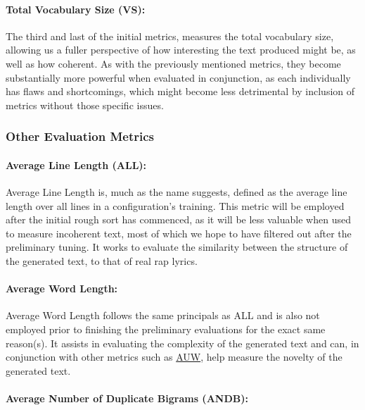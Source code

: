 \paragraph{Total Vocabulary Size (VS):\\[6pt]}
\label{para:total-vocab-size}

The third and last of the initial metrics, measures the total vocabulary size, allowing us a fuller perspective of how interesting the text produced might be, as well as how coherent. As with the previously mentioned metrics, they become substantially more powerful when evaluated in conjunction, as each individually has flaws and shortcomings, which might become less detrimental by inclusion of metrics without those specific issues.

\subsubsection{Other Evaluation Metrics}
\label{sec:other-eval-metrics}

\paragraph{Average Line Length (ALL):\\[6pt]}
\label{sec:avg-sent-length}

Average Line Length is, much as the name suggests, defined as the average line length over all lines in a configuration’s training. This metric will be employed after the initial rough sort has commenced, as it will be less valuable when used to measure incoherent text, most of which we hope to have filtered out after the preliminary tuning. It works to evaluate the similarity between the structure of the generated text, to that of real rap lyrics.

\paragraph{Average Word Length:\\[6pt]}
\label{para:avg-word-length}

Average Word Length follows the same principals as ALL and is also not employed prior to finishing the preliminary evaluations for the exact same reason(s). It assists in evaluating the complexity of the generated text and can, in conjunction with other metrics such as \hyperref[para:avg-unique-words/v]{AUW}, help measure the novelty of the generated text.

\paragraph{Average Number of Duplicate Bigrams (ANDB):\\[6pt]}
\label{para:avg-dupe-bigrams}

